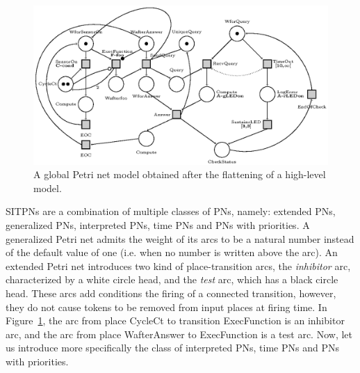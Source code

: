 \documentclass[pdflatex,sn-mathphys]{sn-jnl}%
\theoremstyle{thmstyleone}%
\theoremstyle{thmstyletwo}%
\theoremstyle{thmstylethree}%
\begin{document}
\begin{figure}[H]
\centering
\includegraphics[keepaspectratio=true,width=\textwidth] {impl-model.eps}
\caption[Global Petri net model.]{A global Petri net model obtained
  after the flattening of a \hilecop{} high-level model.}
\label{fig:impl-model}
\end{figure}

SITPNs are a combination of multiple classes of PNs, namely: extended
PNs, generalized PNs, interpreted PNs, time PNs and PNs with
priorities. A generalized Petri net admits the weight of its arcs to
be a natural number instead of the default value of one (i.e. when no
number is written above the arc). An extended Petri net introduces two
kind of place-transition arcs, the \textit{inhibitor} arc,
characterized by a white circle head, and the \textit{test} arc, which
has a black circle head. These arcs add conditions the firing of a
connected transition, however, they do not cause tokens to be removed
from input places at firing time. In Figure~\ref{fig:impl-model}, the
arc from place CycleCt to transition ExecFunction is an inhibitor arc,
and the arc from place WafterAnswer to ExecFunction is a test arc.
Now, let us introduce more specifically the class of interpreted PNs,
time PNs and PNs with priorities.
\end{document}
